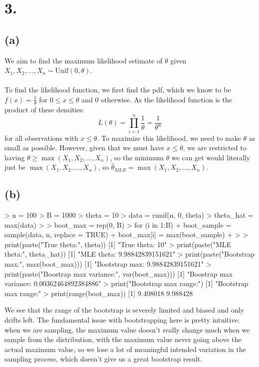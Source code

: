 \documentclass{article}
\begin{document}
{\Large 

\section*{3.}

\subsection*{(a)} 

We aim to find the maximum likelihood estimate of \(\theta\) given \(X_1, X_2, \dots, X_n \sim \text{Unif}(0, \theta)\). \\ \\
To find the likelihood function, we first find the pdf, which we know to be \(f(x) = \frac{1}{\theta}\) for \(0 \leq x \leq \theta\) and 0 otherwise. As the likelihood function is the product of these densities:
\[
  L(\theta) = \prod_{i=1}^{n} \frac{1}{\theta} = \frac{1}{\theta^n}
\]
for all observations with \(x \leq \theta\). To maximize this likelihood, we need to make \(\theta\) as small as possible. However, given that we must have \(x \leq \theta\), we are restricted to having \(\theta \geq \max(X_1, X_2, \dots, X_n)\), so the minimum \(\theta\) we can get would literally just be \(\max(X_1, X_2, \dots, X_n)\), so \(\hat{\theta}_{MLE} = \max(X_1, X_2, \dots, X_n)\).

\subsection*{(b)}

\begin{spverbatim}
> n = 100
> B = 1000
> theta = 10
> data = runif(n, 0, theta)
> theta_hat = max(data)
> 
> boot_max = rep(0, B)
> for (i in 1:B) {
+   boot_sample = sample(data, n, replace = TRUE)
+   boot_max[i] = max(boot_sample)
+ }
> 
> print(paste("True theta:", theta))
[1] "True theta: 10"
> print(paste("MLE theta:", theta_hat))
[1] "MLE theta: 9.98842839151621"
> print(paste("Bootstrap max:", max(boot_max)))
[1] "Bootstrap max: 9.98842839151621"
> print(paste("Boostrap max variance:", var(boot_max)))
[1] "Boostrap max variance: 0.00362464892384886"
> print("Bootstrap max range:")
[1] "Bootstrap max range:"
> print(range(boot_max))
[1] 9.408018 9.988428
\end{spverbatim}
We see that the range of the bootstrap is severely limited and biased and only drifts left. The fundamental issue with bootstrapping here is pretty intuitive: when we are sampling, the maximum value doesn't really change much when we sample from the distribution, with the maximum value never going above the actual maximum value, so we lose a lot of meaningful intended variation in the sampling process, which doesn't give us a great bootstrap result.

}
\end{document}

